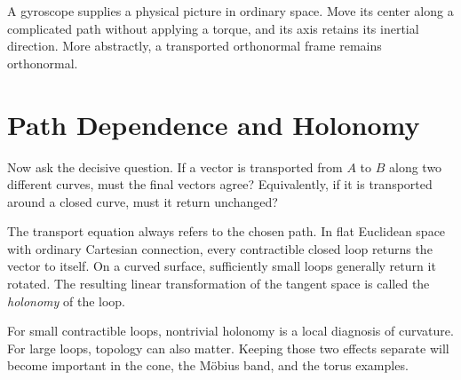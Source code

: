 A gyroscope supplies a physical picture in ordinary space. Move its center
along a complicated path without applying a torque, and its axis retains
its inertial direction. More abstractly, a transported orthonormal frame
remains orthonormal.

\begin{classroomqa}
\end{classroomqa}

\section{Path Dependence and Holonomy}

Now ask the decisive question. If a vector is transported from \(A\) to
\(B\) along two different curves, must the final vectors agree? Equivalently,
if it is transported around a closed curve, must it return unchanged?

The transport equation always refers to the chosen path. In flat
Euclidean space with ordinary Cartesian connection, every contractible
closed loop returns the vector to itself. On a curved surface, sufficiently
small loops generally return it rotated. The resulting linear
transformation of the tangent space is called the \emph{holonomy} of the
loop.

\begin{classroomqa}
\end{classroomqa}

For small contractible loops, nontrivial holonomy is a local diagnosis of
curvature. For large loops, topology can also matter. Keeping those two
effects separate will become important in the cone, the M\"obius band, and
the torus examples.

\begin{classroomqa}
\end{classroomqa}

